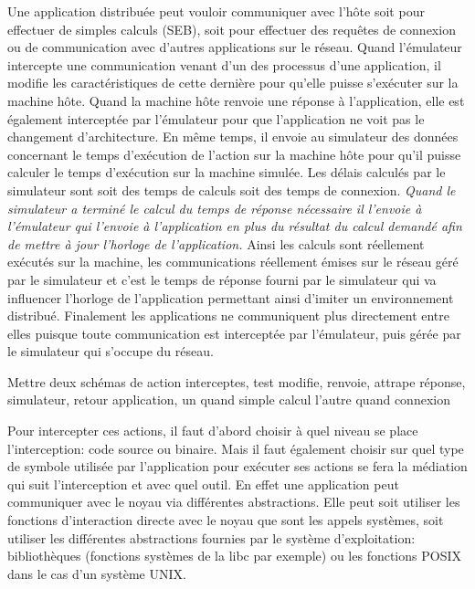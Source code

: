  Une application distribuée peut vouloir communiquer avec l'hôte soit pour
 effectuer de simples calculs (SEB), soit pour effectuer des requêtes de
 connexion ou de communication avec d'autres applications sur le réseau. Quand
 l'émulateur intercepte une communication venant d'un des processus d'une
 application, il modifie les caractéristiques de cette dernière pour qu'elle
 puisse s'exécuter sur la machine hôte. Quand la machine hôte renvoie une
 réponse à l'application, elle est également interceptée par l'émulateur pour
 que l'application ne voit pas le changement d'architecture. En même temps, il
 envoie au simulateur des données concernant le temps d'exécution de l'action
 sur la machine hôte pour qu'il puisse calculer le temps d'exécution sur la
 machine simulée. Les délais calculés par le simulateur sont soit des temps de
 calculs soit des temps de connexion. \textit{Quand le simulateur a terminé le
   calcul du temps de réponse nécessaire il l'envoie à l'émulateur qui l'envoie
   à l'application en plus du résultat du calcul demandé afin de mettre à jour
   l'horloge de l'application.} Ainsi les calculs sont réellement exécutés sur
 la machine, les communications réellement émises sur le réseau géré par le
 simulateur et c'est le temps de réponse fourni par le simulateur qui va
 influencer l'horloge de l'application permettant ainsi d'imiter un
 environnement distribué. Finalement les applications ne communiquent plus
 directement entre elles puisque toute communication est interceptée par
 l'émulateur, puis gérée par le simulateur qui s'occupe du réseau.

{\color{red} Mettre deux schémas de action interceptes, test modifie, renvoie,
  attrape réponse, simulateur, retour application, un quand simple calcul
  l'autre quand connexion}

Pour intercepter ces actions, il faut d'abord choisir à quel niveau se place
l'interception: code source ou binaire. Mais il faut également choisir sur quel
type de symbole utilisée par l'application pour exécuter ses actions se fera la
médiation qui suit l'interception et avec quel outil. En effet une application
peut communiquer avec le noyau via différentes abstractions. Elle peut soit
utiliser les fonctions d'interaction directe avec le noyau que sont les appels
systèmes, soit utiliser les différentes abstractions fournies par le système
d'exploitation: bibliothèques (fonctions systèmes de la libc par exemple) ou les
fonctions POSIX dans le cas d'un système UNIX.


